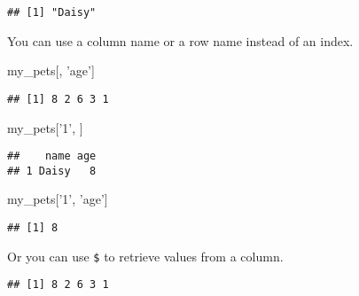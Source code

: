 \documentclass[]{book}
\newenvironment{Shaded}{\begin{snugshade}}{\end{snugshade}}
\newcommand{\DecValTok}[1]{\textcolor[rgb]{0.00,0.00,0.81}{#1}}
\newcommand{\NormalTok}[1]{#1}
\newcommand{\OperatorTok}[1]{\textcolor[rgb]{0.81,0.36,0.00}{\textbf{#1}}}
\newcommand{\StringTok}[1]{\textcolor[rgb]{0.31,0.60,0.02}{#1}}
\begin{document}
\begin{verbatim}
## [1] "Daisy"
\end{verbatim}

You can use a column name or a row name instead of an index.

\begin{Shaded}
\begin{Highlighting}[]
\NormalTok{my_pets[, }\StringTok{'age'}\NormalTok{]}
\end{Highlighting}
\end{Shaded}

\begin{verbatim}
## [1] 8 2 6 3 1
\end{verbatim}

\begin{Shaded}
\begin{Highlighting}[]
\NormalTok{my_pets[}\StringTok{'1'}\NormalTok{, ]}
\end{Highlighting}
\end{Shaded}

\begin{verbatim}
##    name age
## 1 Daisy   8
\end{verbatim}

\begin{Shaded}
\begin{Highlighting}[]
\NormalTok{my_pets[}\StringTok{'1'}\NormalTok{, }\StringTok{'age'}\NormalTok{]}
\end{Highlighting}
\end{Shaded}

\begin{verbatim}
## [1] 8
\end{verbatim}

Or you can use \texttt{\$} to retrieve values from a column.

\begin{Shaded}
\end{Shaded}

\begin{verbatim}
## [1] 8 2 6 3 1
\end{verbatim}

\begin{Shaded}
\end{Shaded}
\end{document}
